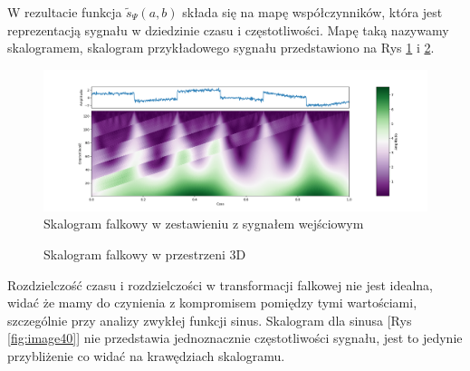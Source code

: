 W rezultacie funkcja $ \tilde{s}_{\Psi}\left(a,b\right)$ składa się na mapę współczynników, która jest reprezentacją sygnału w dziedzinie czasu i częstotliwości. Mapę taką nazywamy skalogramem, skalogram przykładowego sygnału przedstawiono na Rys \ref{fig:image38} i \ref{fig:image39}.

\begin{figure}[ht]
    \centering
    \begin{minipage}[t]{0.9\linewidth}
        \includegraphics[width=\linewidth]{Rozdziały/02.Podstawy_teoretyczne/Obrazy/skalogram.png}
        \caption{Skalogram falkowy w zestawieniu z sygnałem wejściowym}
        \label{fig:image38}
    \end{minipage}
\end{figure}

\begin{figure}[ht]
    \centering
    \caption{Skalogram falkowy w przestrzeni 3D}
    \label{fig:image39}
\end{figure}

Rozdzielczość czasu i rozdzielczości w transformacji falkowej nie jest idealna, widać że mamy do czynienia z kompromisem pomiędzy tymi wartościami, szczególnie przy analizy zwykłej funkcji sinus. Skalogram dla sinusa [Rys \ref{fig:image40}] nie przedstawia jednoznacznie częstotliwości sygnału, jest to jedynie przybliżenie co widać na krawędziach skalogramu.

